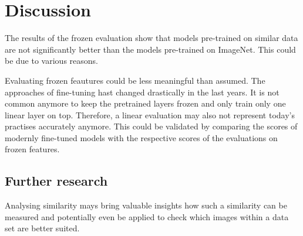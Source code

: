 \chapter{Discussion}

The results of the frozen evaluation show that models pre-trained on similar data are not significantly better than the models pre-trained on ImageNet. This could be due to various reasons.


Evaluating frozen feautures could be less meaningful than assumed. The approaches of fine-tuning hast changed drastically in the last years. It is not common anymore to keep the pretrained layers frozen and only train only one linear layer on top.
Therefore, a linear evaluation may also not represent today's practises accurately anymore. This could be validated by comparing the scores of modernly fine-tuned models with the respective scores of the evaluations on frozen features.


\section{Further research}



Analysing similarity mays bring valuable insights how such a similarity can be measured and potentially even be applied to check which images within a data set are better suited.






